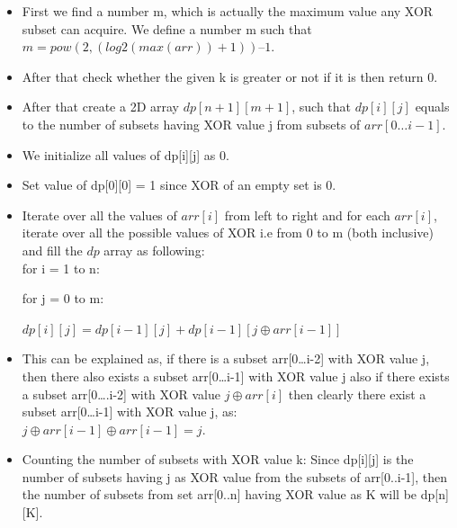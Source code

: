 \documentclass[conference]{IEEEtran}
\begin{document}
\begin{itemize}
\item  First we find a number m, which is actually the maximum value any XOR subset can acquire. We define a number m such that $m = pow(2,(log2(max(arr))+1)) – 1$. 
\item After that check whether the given k is greater or not if it is then return 0. 
\item After that create a 2D array $dp[n+1][m+1]$, such that $dp[i][j]$ equals to the number of subsets having XOR value j from subsets of $arr[0…i-1].$
\item We initialize all values of dp[i][j] as 0.
\item Set value of dp[0][0] = 1 since XOR of an empty set is 0.
\item Iterate over all the values of $arr[i]$ from left to right and for each $arr[i]$, iterate over all the possible values of XOR i.e from 0 to m (both inclusive) and fill the $dp$ array as following:\\
      for i = 1 to n:
       
           \quad for j = 0 to m:
          
             \quad \quad \quad \quad $dp[i][j] = dp[i-1][j] + dp[i-1][j {\oplus} arr[i-1]]$\\
             
                   
\item This can be explained as, if there is a subset arr[0…i-2] with XOR value j, then there also exists a subset arr[0…i-1] with XOR value j also if there exists a subset arr[0….i-2] with XOR value $j \oplus arr[i]$ then clearly there exist a subset arr[0…i-1] with XOR value j, as:\\
$j \oplus arr[i-1] \oplus arr[i-1] = j$.\\

\item Counting the number of subsets with XOR value k: Since dp[i][j] is the number of subsets having j as XOR value from the subsets of arr[0..i-1], then the number of subsets from set arr[0..n] having XOR value as K will be dp[n][K].
\end{itemize}
\end{document}
